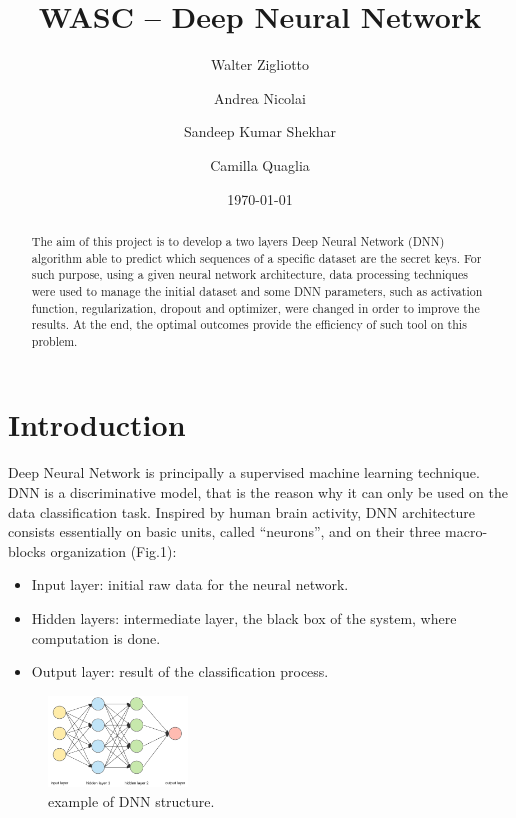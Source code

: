 \documentclass[prl,twocolumn]{revtex4-1}
\begin{document}
\title{WASC -- Deep Neural Network}





\author{Walter Zigliotto}
\author{Andrea Nicolai}
\author{Sandeep Kumar Shekhar}
\author{Camilla Quaglia}

\date{\today}


\begin{abstract}
	
The aim of this project is to develop a two layers Deep Neural Network (DNN) algorithm able to predict which sequences of a specific dataset are the secret keys. For such purpose, using a given neural network architecture, data processing techniques were used to manage the initial dataset and some DNN parameters, such as activation function, regularization, dropout and optimizer, were changed in order to improve the results. At the end, the optimal outcomes provide the efficiency of such tool on this problem.

\end{abstract}

\maketitle


\section{Introduction}

Deep Neural Network is principally a supervised machine learning technique. DNN is a discriminative model, that is the reason why it can only be used on the data classification task. Inspired by human brain activity, DNN architecture consists essentially on basic units, called “neurons”, and on their three macro-blocks organization (Fig.1):
{
\begin{itemize}
	\item Input layer: initial raw data for the neural network.
	\item Hidden layers: intermediate layer, the black box of the system, where computation is done.
	\item Output layer: result of the classification process.
\end{itemize}
}

\begin{figure}[h]
	\includegraphics[width=0.33\textwidth]{DNN_structure.png}
	\caption{example of DNN structure.}
	\label{fig:y}
\end{figure}
\end{document}
